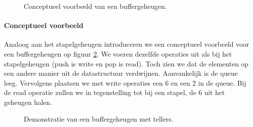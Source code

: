 \begin{figure}[hbt]
\centering
{}
\caption{Conceptueel voorbeeld van een buffergeheugen.}
\label{fig:queueConceptExample}
\end{figure}
\paragraph{Conceptueel voorbeeld}
Analoog aan het stapelgeheugen introduceren we een conceptueel voorbeeld voor een buffergeheugen op figuur \ref{fig:queueConceptExample}. We voeren dezelfde operaties uit als bij het stapelgeheugen (push is write en pop is read). Toch zien we dat de elementen op een andere manier uit de datastructuur verdwijnen. Aanvankelijk is de queue leeg. Vervolgens plaatsen we met write operaties een 6 en een 2 in de queue. Bij de read operatie zullen we in tegenstelling tot bij een stapel, de 6 uit het geheugen halen.
\begin{figure}[hbt]
\centering
{}
\caption{Demonstratie van een buffergeheugen met tellers.}
\label{fig:queueConceptExample}
\end{figure}
